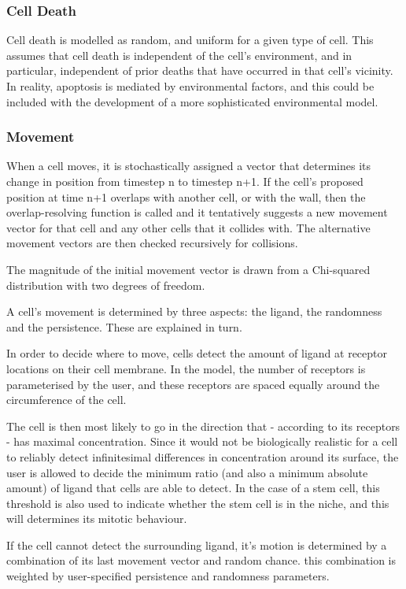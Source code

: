 \documentclass[12pt]{article}
\begin{document}
\subsubsection{Cell Death}
Cell death is modelled as random, and uniform for a given type of cell. 
This assumes that cell death is independent of the cell's environment, 
and in particular, independent of prior deaths that have occurred in 
that cell's vicinity. In reality, apoptosis is mediated by environmental 
factors, and this could be included with the development of a more 
sophisticated environmental model.

\subsubsection{Movement}
When a cell moves, it is stochastically assigned a vector that 
determines its change in position from timestep n to timestep n+1. If 
the cell's proposed position at time n+1 overlaps with another cell, or 
with the wall, then the overlap-resolving function is called and it 
tentatively suggests a new movement vector for that cell and any other 
cells that it collides with. The alternative movement vectors are then 
checked recursively for collisions.

The magnitude of the initial movement vector is drawn from a Chi-squared 
distribution with two degrees of freedom. 

A cell's movement is determined by three aspects: the ligand, the 
randomness and the persistence. These are explained in turn.

In order to decide where to move, cells detect the amount of ligand at 
receptor locations on their cell membrane. In the model, the number of 
receptors is parameterised by the user, and these receptors are spaced 
equally around the circumference of the cell. 

The cell is then most likely to go in the direction that - according to 
its receptors - has maximal concentration. Since it would not be 
biologically realistic for a cell to reliably detect infinitesimal 
differences in concentration around its surface, the user is allowed to 
decide the minimum ratio (and also a minimum absolute amount) of ligand 
that cells are able to detect. In the case of a stem cell, this 
threshold is also used to indicate whether the stem cell is in the 
niche, and this will determines its mitotic behaviour.

If the cell cannot detect the surrounding ligand, it's motion is 
determined by a combination of its last movement vector and random 
chance. this combination is weighted by user-specified persistence and 
randomness parameters.
\end{document}
